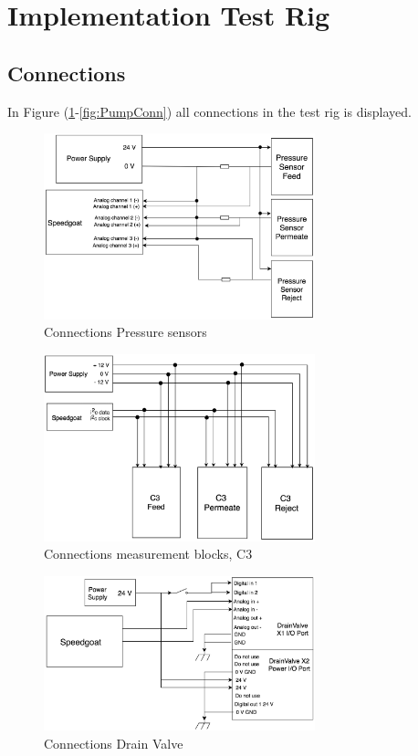 \section{Implementation Test Rig}


\subsection{Connections}
In Figure (\ref{fig:PressConn}-\ref{fig:PumpConn}) all connections in the test rig is displayed.


\begin{figure}[h]
    \centering
    \includegraphics[width=0.7\textwidth]{PressConn}
    \caption{Connections Pressure sensors}
    \label{fig:PressConn}
\end{figure}

\begin{figure}[h]
    \centering
    \includegraphics[width=0.7\textwidth]{C3Conn}
    \caption{Connections measurement blocks, C3}
    \label{fig:C3Conn}
\end{figure}

\begin{figure}[h]
    \centering
    \includegraphics[width=0.7\textwidth]{ValveConn}
    \caption{Connections Drain Valve}
    \label{fig:ValveConn}
\end{figure}


